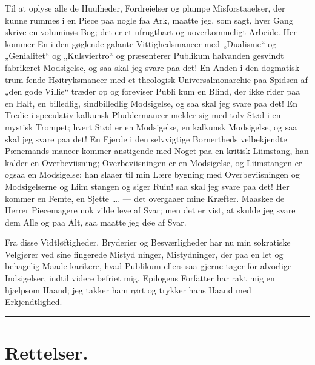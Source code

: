 \documentclass[12pt]{book}
\newcommand{\opage}[1]{\marginnote{\footnotesize\textit{[#1]}}}
\begin{document}
Til at oplyse alle de Huulheder, Fordreielser og plumpe
Misforstaaelser, der kunne rummes i en Piece paa nogle faa
Ark, maatte jeg, som sagt, hver Gang skrive en voluminøs
Bog; det er et ufrugtbart og uoverkommeligt Arbeide. Her
kommer En i den gøglende galante Vittighedsmaneer med
„Dualisme“ og „Genialitet“ og „Kulsviertro“ og præsenterer
Publikum halvanden gesvindt fabrikeret Modsigelse, og saa
skal jeg svare paa det! En Anden i den dogmatisk trum\-%
fende Høitryksmaneer med et theologisk Universalmonarchie
paa Spidsen af „den gode Villie“ træder op og foreviser Publi\-%
kum en Blind, der ikke rider paa en Halt, en billedlig,
sindbilledlig Modsigelse, og saa skal jeg svare paa det! En
Tredie i speculativ-kalkunsk Pluddermaneer melder sig med
tolv Stød i en mystisk Trompet; hvert Stød er en Modsigelse,
en kalkunsk Modsigelse, og saa skal jeg svare paa det! En
Fjerde i den selvvigtige Bornertheds velbekjendte Pænemands\-%
maneer kommer anstigende med Noget paa en kritisk Liimstang,
han kalder en Overbeviisning; Overbeviisningen er en Modsigelse,
og Liimstangen er ogsaa en Modsigelse; han slaaer til min Lære\-%
bygning med Overbeviisningen og Modsigelserne og Liim\-%
stangen og siger Ruin! saa skal jeg svare paa det! Her
kommer en Femte, en Sjette \ldots. --- det overgaaer mine
Kræfter. Maaskee de Herrer Piecemagere nok vilde leve af
Svar; men det er vist, at skulde jeg svare dem Alle og paa
Alt, saa maatte jeg døe af Svar.

Fra disse Vidtløftigheder, Bryderier og Besværligheder
\opage{326}\setcounter{footnote}{0}%
har nu min sokratiske Velgjører ved sine fingerede Mistyd\-%
ninger, Mistydninger, der paa en let og behagelig Maade
karikere, hvad Publikum ellers saa gjerne tager for alvorlige
Indsigelser, indtil videre befriet mig. Epilogens Forfatter har
rakt mig en hjælpsom Haand; jeg takker ham rørt og trykker
hans Haand med Erkjendtlighed.

\begin{center}\rule{3cm}{0.4pt}\end{center}

\backmatter
\chapter*{Rettelser.}
\end{document}
